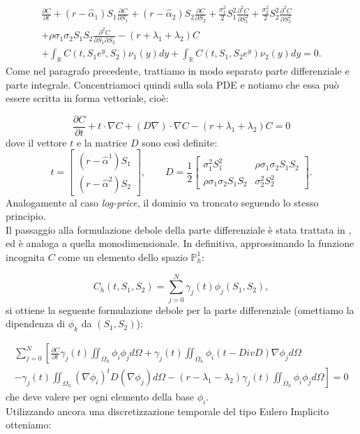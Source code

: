 \documentclass[a4paper,10pt]{report}
\newcommand{\der}[2]{\frac{\partial #1}{\partial #2}}
\newcommand{\dder}[2]{\frac{\partial^2 #1}{\partial #2^2}}
\newcommand{\dmix}[3]{\frac{\partial^2 #1}{\partial #2 \partial #3}}
\theoremstyle{plain}
\theoremstyle{definition}
\theoremstyle{remark}
\begin{document}
\begin{multline*}
 \der{C}{t}+(r-\hat{\alpha}_1)S_1\der{C}{S_1}+(r-\hat{\alpha}_2)S_2\der{C}{S_2}+\frac{\sigma^2_1}{2}S_1^2\dder{C}{S_1}+\frac{\sigma^2_2}{2}S_2^2\dder{C}{S_2}\\
 +\rho\sigma_1\sigma_2S_1S_2\dmix{C}{S_1}{S_2}-(r+\lambda_1+\lambda_2)C\\
 +\int_\mathbb{R}C(t,S_1e^y,S_2)\nu_1(y)dy+\int_\mathbb{R}C(t,S_1,S_2e^y)\nu_2(y)dy=0.
\end{multline*}
Come nel paragrafo precedente, trattiamo in modo separato parte differenziale e parte integrale. Concentriamoci quindi sulla sola PDE e notiamo che essa pu\`o essere scritta in forma vettoriale, cio\`e:

\begin{equation}
 \der{C}{t}+t\cdot\nabla C+(D\nabla)\cdot\nabla C -(r+\lambda_1+\lambda_2)C=0
\end{equation}
dove il vettore $t$ e la matrice $D$ sono così definite:
\begin{equation*}
t=
\begin{bmatrix}
 (r-\hat{\alpha}^1)S_1\\
 (r-\hat{\alpha}^2)S_2
\end{bmatrix},
\qquad
D=\frac{1}{2}
\begin{bmatrix}
 \sigma^2_1 S_1^2 & \rho\sigma_1\sigma_2S_1S_2 \\
 \rho\sigma_1\sigma_2S_1S_2 & \sigma^2_2 S_2^2
\end{bmatrix}.
\end{equation*}
Analogamente al caso \emph{log-price}, il dominio va troncato seguendo lo stesso principio.\\
Il passaggio alla formulazione debole della parte differenziale è stata trattata in \cite{tao2009finite}, ed è analoga a quella monodimensionale. In definitiva, approssimando la funzione incognita $C$ come un elemento dello spazio $\mathbb{P}_h^1$:

\begin{equation*}
C_h(t,S_1,S_2)=\sum_{j=0}^N\gamma_j(t)\phi_j(S_1,S_2),
\end{equation*}
si ottiene la seguente formulazione debole per la parte differenziale (omettiamo la dipendenza di $\phi_k$ da $(S_1,S_2)$):

\begin{multline*}
 \sum_{j=0}^N\left[\der{C}{t}\gamma_j(t)\iint_{\Omega_h}\phi_i\phi_j d\Omega +\gamma_j(t)\iint_{\Omega_h}\phi_i(t-Div D) \nabla\phi_j d\Omega\right.\\
 \left.-\gamma_j(t)\iint_{\Omega_h}(\nabla\phi_i)^t D (\nabla\phi_j) d\Omega-(r-\lambda_1-\lambda_2)\gamma_j(t)\iint_{\Omega_h}\phi_i\phi_j d\Omega \right]=0
\end{multline*}
che deve valere per ogni elemento della base $\phi_i$.\\
Utilizzando ancora una discretizzazione temporale del tipo Eulero Implicito otteniamo:
\end{document}
